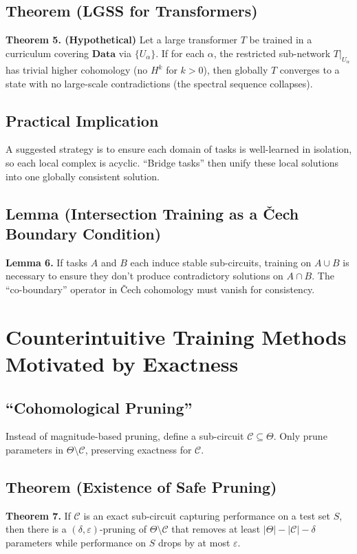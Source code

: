 \documentclass{article}
\begin{document}
\subsection{Theorem (LGSS for Transformers)}
\textbf{Theorem 5. (Hypothetical)}  
Let a large transformer $T$ be trained in a curriculum covering $\mathbf{Data}$ via $\{U_\alpha\}$. If for each $\alpha$, the restricted sub-network $T|_{U_\alpha}$ has trivial higher cohomology (no $H^k$ for $k>0$), then globally $T$ converges to a state with no large-scale contradictions (the spectral sequence collapses).

\subsection{Practical Implication}
A suggested strategy is to ensure each domain of tasks is well-learned in isolation, so each local complex is acyclic. “Bridge tasks” then unify these local solutions into one globally consistent solution.

\subsection{Lemma (Intersection Training as a \v{C}ech Boundary Condition)}
\textbf{Lemma 6.}  
If tasks $A$ and $B$ each induce stable sub-circuits, training on $A\cup B$ is necessary to ensure they don’t produce contradictory solutions on $A\cap B$. The “co-boundary” operator in \v{C}ech cohomology must vanish for consistency.

\section{Counterintuitive Training Methods Motivated by Exactness}

\subsection{“Cohomological Pruning”}
Instead of magnitude-based pruning, define a sub-circuit $\mathcal{C}\subseteq \Theta$. Only prune parameters in $\Theta\setminus \mathcal{C}$, preserving exactness for $\mathcal{C}$.

\subsection{Theorem (Existence of Safe Pruning)}
\textbf{Theorem 7.}  
If $\mathcal{C}$ is an exact sub-circuit capturing performance on a test set $S$, then there is a $(\delta,\varepsilon)$-pruning of $\Theta\setminus \mathcal{C}$ that removes at least $|\Theta| - |\mathcal{C}| - \delta$ parameters while performance on $S$ drops by at most $\varepsilon$.
\end{document}
